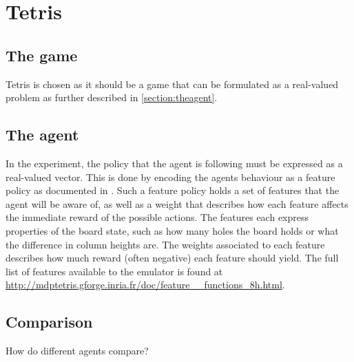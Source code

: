 \section{Tetris}

\subsection{The game}



Tetris is chosen as it should be a game that can be formulated as 
a real-valued problem as further described in \ref{section:theagent}.



\subsection{The agent \label{section:theagent}}


In the experiment, the policy that the agent is following must be 
expressed as a real-valued vector. This is done by encoding the 
agents behaviour as a feature policy as documented in \citep{mdptetris}.
Such a feature policy holds a set of features that the agent will be aware
of, as well as a weight that describes how each feature affects the 
immediate reward of the possible actions. The features each express
properties of the board state, such as how many holes the board holds
or what the difference in column heights are. The weights associated 
to each feature describes how much reward (often negative) each feature
should yield. The full list of features available to the emulator is found 
at \hyperref[]{http://mdptetris.gforge.inria.fr/doc/feature\_\_functions\_8h.html}.


\subsection{Comparison}

How do different agents compare?
